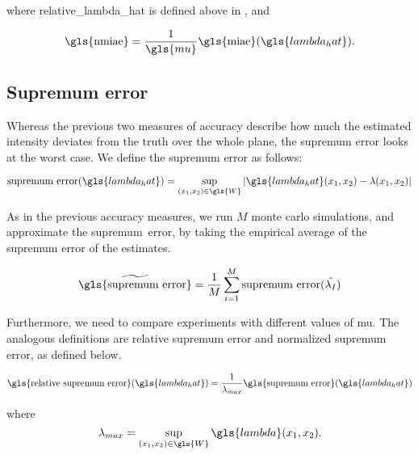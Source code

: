 where \gls{relative_lambda_hat} is defined above in ,
and

\begin{equation}
\label{eq:nmiae}
    \mbox{\gls{nmiae}} = 
        \frac{1}{\gls{mu}} \mbox{\gls{miae}}(\gls{lambda_hat}) \text{.}
\end{equation}


\subsection{Supremum error}
\label{subsec:method:sup_error}

Whereas the previous two measures of accuracy describe how much the estimated intensity deviates from the truth over the whole plane,
the \gls{supremum error} looks at the worst case.
We define the \gls{supremum error} as follows:

\begin{equation}
    \mbox{supremum error}(\gls{lambda_hat}) = \sup_{\xvec \in \gls{W}}
        {\left|
            \gls{lambda_hat}\xvec - \lambda\xvec
        \right|}
\end{equation}

As in the previous accuracy measures, we run $M$ monte carlo simulations, and approximate the \mbox{supremum error}, by taking the empirical average of the supremum error of the estimates.

\begin{equation}
    \widetilde{\mbox{\gls{supremum error}}} = \frac{1}{M} \sum_{i=1}^{M} \mbox{supremum error}(\hat{\lambda_I})
\end{equation}

Furthermore, we need to compare experiments with different values of \gls{mu}.
The analogous definitions are \gls{relative supremum error} and \gls{normalized supremum error}, as defined below.

\begin{equation}
\label{eq:relative_supremum_error}
    \mbox{\gls{relative supremum error}}(\gls{lambda_hat}) = 
        \frac{1}{\lambda_{max}} \mbox{\gls{supremum error}}(\gls{lambda_hat}) \\
\end{equation}

where
\begin{equation}
\label{eq:lambda_max}
    \lambda_{max} = \sup_{\xvec \in \gls{W}}{\gls{lambda}\xvec} \text{.}
\end{equation}

